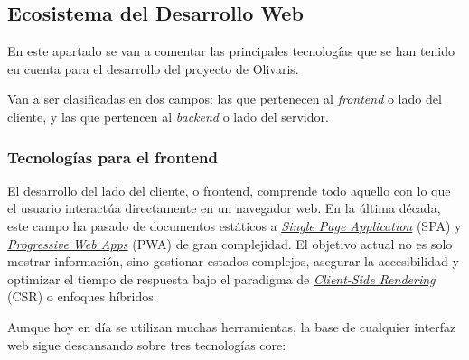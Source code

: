 \subsection{Ecosistema del Desarrollo Web}

En este apartado se van a comentar las principales tecnologías que se han tenido en cuenta para el desarrollo del
proyecto de Olivaris.

Van a ser clasificadas en dos campos: las que pertenecen al \textit{frontend} o lado del cliente, y las que pertencen
al \textit{backend} o lado del servidor.

\subsubsection{Tecnologías para el frontend}

El desarrollo del lado del cliente, o frontend, comprende todo aquello con lo que el usuario interactúa directamente 
en un navegador web. En la última década, este campo ha pasado de documentos estáticos a \hyperlink{singlePageApplication}{\textit{Single Page Application}} 
(SPA) y \hyperlink{progressiveWebApps}{\textit{Progressive Web Apps}} (PWA) de gran complejidad. El objetivo actual 
no es solo mostrar información, sino gestionar estados complejos, asegurar la accesibilidad y optimizar el tiempo de 
respuesta bajo el paradigma de \hyperlink{clientSideRendering}{\textit{Client-Side Rendering}} (CSR) o enfoques 
híbridos.

Aunque hoy en día se utilizan muchas herramientas, la base de cualquier interfaz web sigue descansando sobre tres 
tecnologías core:   

